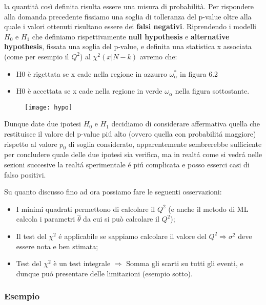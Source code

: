 \documentclass[11pt,a4paper]{book}
\begin{document}
\noindent la quantit\`{a} cos\`{i} definita risulta essere una misura di probabilit\`{a}. Per rispondere alla domanda precedente fissiamo una soglia di tolleranza del p-value oltre alla quale i valori ottenuti risultano essere dei \textbf{falsi negativi}. Riprendendo i modelli $H_0$ e $H_1$ che definiamo rispettivamente \textbf{null hypothesis} e \textbf{alternative hypothesis}, fissata una soglia del p-value, e definita una statistica x associata (come per esempio il $Q^2$) al $\chi^2(x \vert N-k)$ avremo che:
\begin{itemize}
	\item H0 \`{e} rigettata se x cade nella regione in azzurro $\omega_\alpha^* $ in figura 6.2
	\item H0 \`{e} accettata se x cade nella regione in verde $\omega_\alpha$ nella figura sottostante.
\end{itemize}
\begin{figure}[ht]
\texttt{[image: hypo]}	
\centering
\end{figure}
Dunque date due ipotesi $H_0$ e $H_1$ decidiamo di considerare affermativa quella che restituisce il valore del p-value pi\'{u} alto (ovvero quella con probabilit\'{a} maggiore) rispetto al valore $p_0$ di soglia considerato, apparentemente sembrerebbe sufficiente per concludere quale delle due ipotesi sia verifica, ma in realt\'{a} come si vedr\'{a} nelle sezioni succesive la realt\'{a} sperimentale \'{e} pi\'{u} complicata e posso esserci casi di falso positivi.

\noindent Su quanto discusso fino ad ora possiamo fare le seguenti osservazioni:
\begin{itemize}
	\item I minimi quadrati permettono di calcolare il $Q^2$ (e anche il metodo di ML calcola i parametri $\hat{\theta}$ da cui si può calcolare il $Q^2$);
	\item Il test del $\chi^2$ \'{e} applicabile se sappiamo calcolare il valore del $Q^2 \Rightarrow \sigma^2$  deve essere nota e ben stimata;
	\item Test del $\chi^2$ è un test integrale $\Rightarrow$ Somma gli scarti su tutti gli eventi, e dunque pu\'{o} presentare delle limitazioni (esempio sotto).
\end{itemize}

\subsubsection{Esempio}
\end{document}
